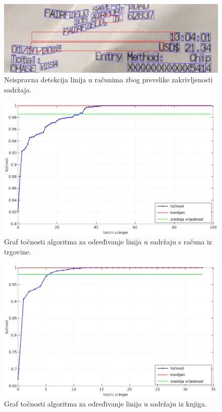 \documentclass[times, utf8, zavrsni]{fer}
\begin{document}
\

\begin{figure}[!htb]
    \centering
    \captionsetup{justification=centering}
    \includegraphics[width=\textwidth]{images/error-01.png}
    \caption{
        Neispravna detekcija linija u računima zbog prevelike zakrivljenosti
        sadržaja.
    }
    \label{fig:error-01}
\end{figure}

\pagebreak

\begin{figure}[!htb]
    \centering
    \captionsetup{justification=centering}
    \includegraphics[width=\textwidth]{images/result-01.png}
    \caption{
        Graf točnosti algoritma za određivanje linija u sadržaju s računa iz trgovine.
    }
    \label{fig:result-01}
\end{figure}

\begin{figure}[!htb]
    \centering
    \captionsetup{justification=centering}
    \includegraphics[width=\textwidth]{images/result-02.png}
    \caption{
        Graf točnosti algoritma za određivanje linija u sadržaju iz knjiga.
    }
    \label{fig:result-02}
\end{figure}
\end{document}
